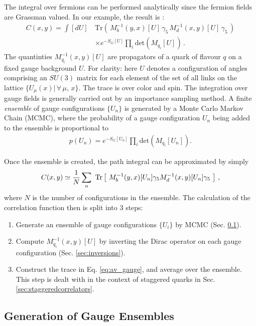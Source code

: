 The integral over fermions can be performed analytically since the fermion fields are Grassman valued. In our example, the result is \cite{Peskin:1995ev}:
\begin{align}
  \nonumber
  C(x,y) = \int [dU]\, &\text{Tr}\left( \, M^{-1}_b(y,x)[U] \, \gamma_5 \, M^{-1}_d(x,y)[U] \, \gamma_5 \, \right) \\ &\times e^{-S_G[U]} \prod_i\text{det}(M_{q_i}[U])\,.
  \label{eq:lattice_correlator}
\end{align}
The quantinties $M_{q_i}^{-1}(x,y)[U]$ are propagators of a quark of flavour $q$ on a fixed gauge background $U$. For clarity: here $U$ denotes a configuration of angles comprising an $SU(3)$ matrix for each element of the set of all links on the lattice $\{ U_{\mu}(x) | \,\forall \,\mu,\,x \}$. The trace is over color and spin. The integration over gauge fields is generally carried out by an importance sampling method. A finite \textit{ensemble} of gauge configurations $\{U_n\}$ is generated by a Monte Carlo Markov Chain (MCMC), where the probability of a gauge configuration $U_n$ being added to the ensemble is proportional to
\begin{align}
  p(U_n) = e^{-S_G[U_n]}\prod_i\text{det}(M_{q_i}[U_n]).
  \label{eq:MCweight}
\end{align}

Once the ensemble is created, the path integral can be approximated by simply
\begin{align}
  C(x,y) \simeq {1\over N} \sum_n \text{ Tr}\left[\text{ } M^{-1}_b(y,x)[U_n] \gamma_5 M^{-1}_d(x,y)[U_n] \gamma_5 \text{ }\right]\,,
  \label{eq:av_gauge}
\end{align}
where $N$ is the number of configurations in the ensemble. The calculation of the correlation function then is split into 3 steps:
\begin{enumerate}
\item
  Generate an ensemble of gauge configurations $\{ U_i \}$ by MCMC (Sec. \ref{sec:MCMC}).
\item
  Compute $M^{-1}_{q_i}(x,y)[U]$ by inverting the Dirac operator on each gauge configuration (Sec. \ref{sec:inversions}).
\item
  Construct the trace in Eq. \eqref{eq:av_gauge}, and average over the ensemble. This step is dealt with in the context of staggered quarks in Sec. \ref{sec:staggeredcorrelators}.
\end{enumerate}


\subsection{Generation of Gauge Ensembles}
\label{sec:MCMC}

